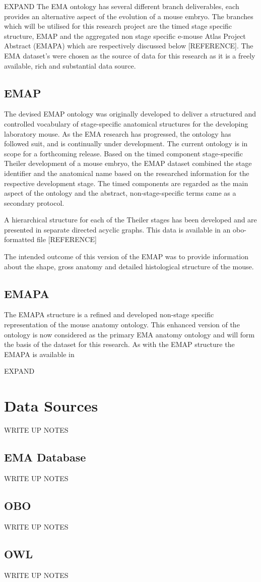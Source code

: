 EXPAND
The EMA ontology has several different branch deliverables, each provides an alternative aspect of the evolution of a mouse embryo. The branches which will be utilised for this research project are the timed stage specific structure, EMAP and the aggregated non stage specific e-mouse Atlas Project Abstract (EMAPA) which are respectively discussed below [REFERENCE]. The EMA dataset's were chosen as the source of data for this research as it is a freely available, rich and substantial data source.

\subsection{EMAP}
The devised EMAP ontology was originally developed to deliver a structured and controlled vocabulary of stage-specific anatomical structures for the developing laboratory mouse. As the EMA research has progressed, the ontology has followed suit, and is continually under development. The current ontology is in scope for a forthcoming release.
Based on the timed component stage-specific Theiler development of a mouse embryo, the EMAP dataset combined the stage identifier and the anatomical name based on the researched information for the respective development stage. The timed components are regarded as the main aspect of the ontology and the abstract, non-stage-specific terms came as a secondary protocol.

A hierarchical structure for each of the Theiler stages has been developed and are presented in separate directed acyclic graphs. This data is available in an obo-formatted file [REFERENCE]

The intended outcome of this version of the EMAP was to provide information about the shape, gross anatomy and detailed histological structure of the mouse.

\subsection{EMAPA}
The EMAPA structure is a refined and developed non-stage specific representation of the mouse anatomy ontology. This enhanced version of the ontology is now considered as the primary EMA anatomy ontology and will form the basis of the dataset for this research. As with the EMAP structure the EMAPA is available in 

EXPAND
\section{Data Sources}
WRITE UP NOTES
\subsection{EMA Database}
WRITE UP NOTES
\subsection{OBO}
WRITE UP NOTES
\subsection{OWL}
WRITE UP NOTES

